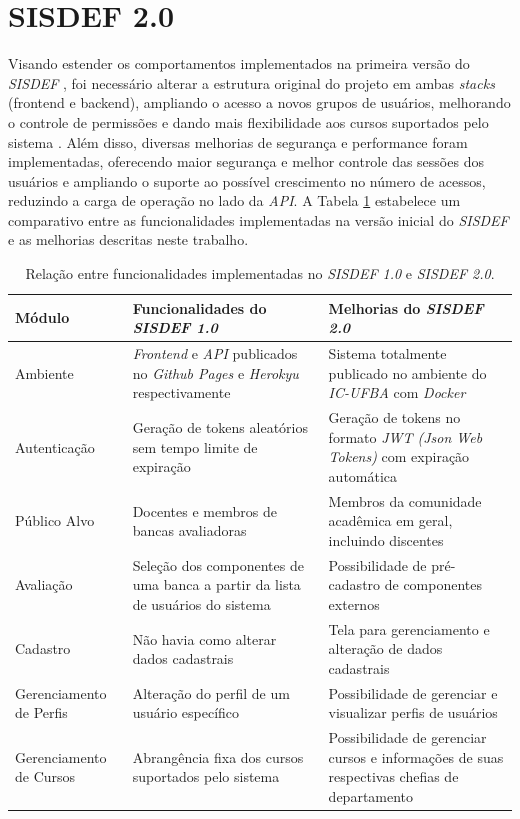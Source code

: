 \documentclass[nonacm, sigconf]{acmart}
\begin{document}
\section{SISDEF 2.0}
\label{section:sisdef_v2}

Visando estender os comportamentos implementados na primeira versão do \textit{SISDEF} \cite{gabrieltcc}, foi necessário alterar a estrutura original do projeto em ambas \textit{stacks} (frontend e backend), ampliando o acesso a novos grupos de usuários, melhorando o controle de permissões e dando mais flexibilidade aos cursos suportados pelo sistema \cite{sis}. Além disso, diversas melhorias de segurança e performance foram implementadas, oferecendo maior segurança e melhor controle das sessões dos usuários e ampliando o suporte ao possível crescimento no número de acessos, reduzindo a carga de operação no lado da \textit{API}. A Tabela \ref{tab:newest-features-table} estabelece um comparativo entre as funcionalidades implementadas na versão inicial do \textit{SISDEF} e as melhorias descritas neste trabalho.

\begin{table}[ht]
  \caption{Relação entre funcionalidades implementadas no \textit{SISDEF 1.0} e \textit{SISDEF 2.0}.}
  \label{tab:newest-features-table}
  \centering
  \small
  \renewcommand{\arraystretch}{1.4}
  \begin{tabularx}{1.0\columnwidth}{p{} X X}
    \toprule
    Módulo & Funcionalidades do \textit{SISDEF 1.0} & Melhorias do \textit{SISDEF 2.0} \\
    \midrule
    Ambiente & \textit{Frontend} e \textit{API} publicados no \textit{Github Pages} e \textit{Herokyu} respectivamente & Sistema totalmente publicado no ambiente do \textit{IC-UFBA} com \textit{Docker} \\
    Autenticação & Geração de tokens aleatórios sem tempo limite de expiração & Geração de tokens no formato \textit{JWT (Json Web Tokens)} com expiração automática \\
    Público Alvo & Docentes e membros de bancas avaliadoras & Membros da comunidade acadêmica em geral, incluindo discentes \\
    Avaliação & Seleção dos componentes de uma banca a partir da lista de usuários do sistema & Possibilidade de pré-cadastro de componentes externos \\
    Cadastro & Não havia como alterar dados cadastrais & Tela para gerenciamento e alteração de dados cadastrais \\
    Gerenciamento de Perfis & Alteração do perfil de um usuário específico & Possibilidade de gerenciar e visualizar perfis de usuários \\
    Gerenciamento de Cursos & Abrangência fixa dos cursos suportados pelo sistema & Possibilidade de gerenciar cursos e informações de suas respectivas chefias de departamento \\
    \bottomrule
  \end{tabularx}
\end{table}
\end{document}
